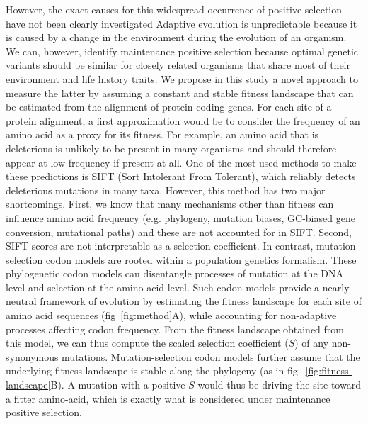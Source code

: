 \documentclass{article}
\newcommand{\NS}[1]{\textcolor{red}{\textbf{\emph{[NS: #1]}}}}
\newcommand{\Sphy}{S}
\begin{document}
    However, the exact causes for this widespread occurrence of positive selection have not been clearly investigated\cite{eyre-walker_distribution_2006, eyre-walker_estimating_2009, galtier_adaptive_2016} %
    Adaptive evolution is unpredictable because it is caused by a change in the environment during the evolution of an organism.
    We can, however, identify maintenance positive selection because optimal genetic variants should be similar for closely related organisms that share most of their environment and life history traits.
    We propose in this study a novel approach to measure the latter by assuming a constant and stable fitness landscape that can be estimated from the alignment of protein-coding genes.
    For each site of a protein alignment, a first approximation would be to consider the frequency of an amino acid as a proxy for its fitness.
    For example, an amino acid that is deleterious is unlikely to be present in many organisms and should therefore appear at low frequency if present at all.
    One of the most used methods to make these predictions is SIFT (Sort Intolerant From Tolerant), which reliably detects deleterious mutations in many taxa\cite{ng_sift_2003, vaser_sift_2016}.
    However, this method has two major shortcomings.
    First, we know that many mechanisms other than fitness can influence amino acid frequency (e.g. phylogeny, mutation biases, GC-biased gene conversion, mutational paths) and these are not accounted for in SIFT\@.
    Second, SIFT scores are not interpretable as a selection coefficient.
    In contrast, mutation-selection codon models are rooted within a population genetics formalism\cite{halpern_evolutionary_1998, mccandlish_modeling_2014}.
    These phylogenetic codon models can disentangle processes of mutation at the DNA level and selection at the amino acid level.
    Such codon models provide a nearly-neutral framework of evolution by estimating the fitness landscape for each site of amino acid sequences (fig~\ref{fig:method}A), while accounting for non-adaptive processes affecting codon frequency\cite{halpern_evolutionary_1998, rodrigue_mechanistic_2010, tamuri_estimating_2012, latrille_improved_2022}.
    From the fitness landscape obtained from this model, we can thus compute the scaled selection coefficient ($\Sphy$) of any non-synonymous mutations.
    Mutation-selection codon models further assume that the underlying fitness landscape is stable along the phylogeny (as in fig.~\ref{fig:fitness-landscape}B).
    A mutation with a positive $\Sphy$ would thus be driving the site toward a fitter amino-acid, which is exactly what is considered under maintenance positive selection.
\end{document}
